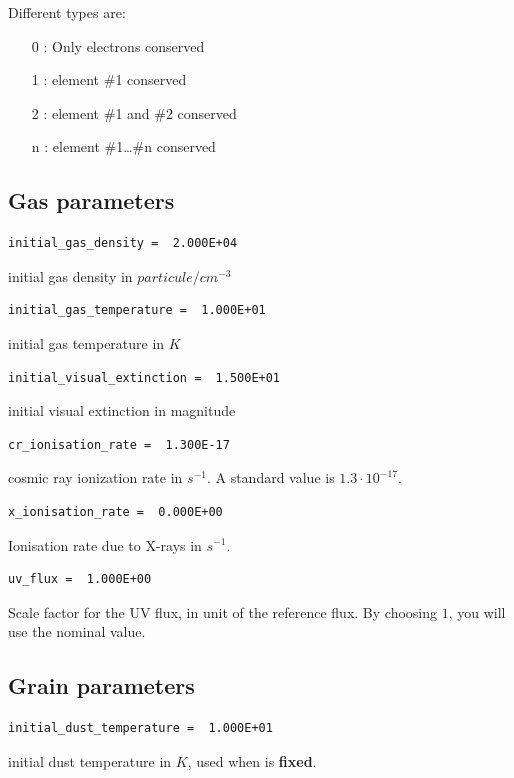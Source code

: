 \documentclass[english,a4paper,twoside]{article}
\begin{document}
Different types are:
\begin{itemize}
\item[0] : Only electrons conserved
\item[1] : element \#1 conserved
\item[2] : element \#1 and \#2 conserved
\item[n] : element \#1\dots\#n conserved
\end{itemize}

\subsection{Gas parameters}


\begin{verbatim}
initial_gas_density =  2.000E+04
\end{verbatim}
initial gas density in $\unit{particule/cm^{-3}}$

\begin{verbatim}
initial_gas_temperature =  1.000E+01
\end{verbatim}
initial gas temperature  in $\unit{K}$

\begin{verbatim}
initial_visual_extinction =  1.500E+01
\end{verbatim}
initial visual extinction in magnitude

\begin{verbatim}
cr_ionisation_rate =  1.300E-17
\end{verbatim}
cosmic ray ionization rate in $\unit{s^{-1}}$. A standard value is $1.3\cdot 10^{-17}$.

\begin{verbatim}
x_ionisation_rate =  0.000E+00
\end{verbatim}
Ionisation rate due to X-rays in $\unit{s^{-1}}$.

\begin{verbatim}
uv_flux =  1.000E+00
\end{verbatim}
Scale factor for the UV flux, in unit of the reference flux. By choosing $1$, you will use the nominal value.

\subsection{Grain parameters}
\begin{verbatim}
initial_dust_temperature =  1.000E+01
\end{verbatim}
initial dust temperature in $\unit{K}$, used when  is \textbf{fixed}.
\end{document}

